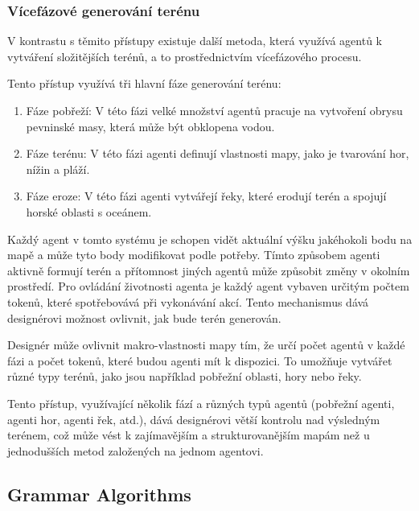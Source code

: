 \subsubsection{Vícefázové generování terénu}
V kontrastu s těmito přístupy existuje další metoda, která využívá agentů k vytváření složitějších terénů, a to prostřednictvím vícefázového procesu.

Tento přístup využívá tři hlavní fáze generování terénu:

\begin{enumerate}
    \item Fáze pobřeží: V této fázi velké množství agentů pracuje na vytvoření obrysu pevninské masy, která může být obklopena vodou.
    \item Fáze terénu: V této fázi agenti definují vlastnosti mapy, jako je tvarování hor, nížin a pláží.
    \item Fáze eroze: V této fázi agenti vytvářejí řeky, které erodují terén a spojují horské oblasti s oceánem.
\end{enumerate}

Každý agent v tomto systému je schopen vidět aktuální výšku jakéhokoli bodu na mapě a může tyto body modifikovat podle potřeby. Tímto způsobem agenti aktivně formují terén a přítomnost jiných agentů může způsobit změny v okolním prostředí. Pro ovládání životnosti agenta je každý agent vybaven určitým počtem tokenů, které spotřebovává při vykonávání akcí. Tento mechanismus dává designérovi možnost ovlivnit, jak bude terén generován.

Designér může ovlivnit makro-vlastnosti mapy tím, že určí počet agentů v každé fázi a počet tokenů, které budou agenti mít k dispozici. To umožňuje vytvářet různé typy terénů, jako jsou například pobřežní oblasti, hory nebo řeky.

Tento přístup, využívající několik fází a různých typů agentů (pobřežní agenti, agenti hor, agenti řek, atd.), dává designérovi větší kontrolu nad výsledným terénem, což může vést k zajímavějším a strukturovanějším mapám než u jednodušších metod založených na jednom agentovi. \cite{Agent-basedClanek}


\subsection{Grammar Algorithms}

